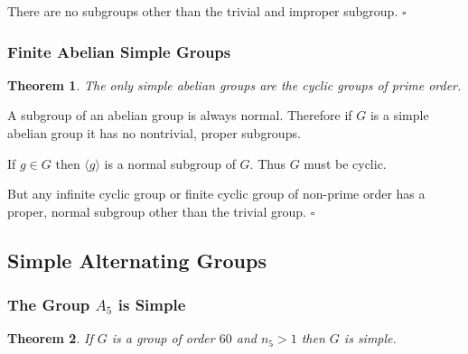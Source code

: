 \documentclass[10pt]{article}
\newtheorem{theorem}{Theorem}[section]
\newenvironment{proof}[1][Proof]{\begin{trivlist}
\item[\hskip \labelsep {\itshape #1}]}{\end{trivlist}}
\begin{document}
\begin{proof}
There are no subgroups other than the trivial and improper subgroup. $\square$
\end{proof}

\subsubsection{Finite Abelian Simple Groups}

\begin{theorem}
The only simple abelian groups are the cyclic groups of prime order.
\end{theorem}

\begin{proof}
A subgroup of an abelian group is always normal. Therefore if $G$ is a simple abelian group it has no nontrivial, proper subgroups.

If $g \in G$ then $\langle g \rangle$ is a normal subgroup of $G$. Thus $G$ must be cyclic.

But any infinite cyclic group or finite cyclic group of non-prime order has a proper, normal subgroup other than the trivial group. $\square$
\end{proof}

\subsection{Simple Alternating Groups}

\subsubsection{The Group $A_5$ is Simple}

\begin{theorem}
If $G$ is a group of order $60$ and $n_5 > 1$ then $G$ is simple.
\end{theorem}
\end{document}
